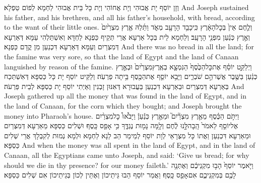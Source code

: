 {וְזָן יוֹסֵף יָת אֲבוּהִי וְיָת אֲחוֹהִי וְיָת כָּל בֵּית אֲבוּהִי לַחְמָא לְפוֹם טַפְלָא׃}
{And Joseph sustained his father, and his brethren, and all his father’s household, with bread, according to the want of their little ones.}{}
{וְלֶ֤חֶם אֵין֙ בְּכׇל\maqqaf הָאָ֔רֶץ כִּֽי\maqqaf כָבֵ֥ד הָרָעָ֖ב מְאֹ֑ד וַתֵּ֜לַהּ אֶ֤רֶץ מִצְרַ֙יִם֙ וְאֶ֣רֶץ כְּנַ֔עַן מִפְּנֵ֖י הָרָעָֽב׃}
{וְלַחְמָא לֵית בְּכָל אַרְעָא אֲרֵי תְּקֵיף כַּפְנָא לַחְדָּא וְאִשְׁתַּלְהִי עַמָּא דְּאַרְעָא דְּמִצְרַיִם וְעַמָּא דְּאַרְעָא דִּכְנַעַן מִן קֳדָם כַּפְנָא׃}
{And there was no bread in all the land; for the famine was very sore, so that the land of Egypt and the land of Canaan languished by reason of the famine.}{}
{וַיְלַקֵּ֣ט יוֹסֵ֗ף אֶת\maqqaf כׇּל\maqqaf הַכֶּ֙סֶף֙ הַנִּמְצָ֤א בְאֶֽרֶץ\maqqaf מִצְרַ֙יִם֙ וּבְאֶ֣רֶץ כְּנַ֔עַן בַּשֶּׁ֖בֶר אֲשֶׁר\maqqaf הֵ֣ם שֹׁבְרִ֑ים וַיָּבֵ֥א יוֹסֵ֛ף אֶת\maqqaf הַכֶּ֖סֶף בֵּ֥יתָה פַרְעֹֽה׃}
{וְלַקֵּיט יוֹסֵף יָת כָּל כַּסְפָּא דְּאִשְׁתְּכַח בְּאַרְעָא דְּמִצְרַיִם וּבְאַרְעָא דִּכְנַעַן בַּעֲבוּרָא דְּאִנּוּן זָבְנִין וְאַיְתִי יוֹסֵף יָת כַּסְפָּא לְבֵית פַּרְעֹה׃}
{And Joseph gathered up all the money that was found in the land of Egypt, and in the land of Canaan, for the corn which they bought; and Joseph brought the money into Pharaoh’s house.}{}
{וַיִּתֹּ֣ם הַכֶּ֗סֶף מֵאֶ֣רֶץ מִצְרַ֘יִם֮ וּמֵאֶ֣רֶץ כְּנַ֒עַן֒ וַיָּבֹ֩אוּ֩ כׇל\maqqaf מִצְרַ֨יִם אֶל\maqqaf יוֹסֵ֤ף לֵאמֹר֙ הָֽבָה\maqqaf לָּ֣נוּ לֶ֔חֶם וְלָ֥מָּה נָמ֖וּת נֶגְדֶּ֑ךָ כִּ֥י אָפֵ֖ס כָּֽסֶף׃}
{וּשְׁלִים כַּסְפָּא מֵאַרְעָא דְּמִצְרַיִם וּמֵאַרְעָא דִּכְנַעַן וַאֲתוֹ כָּל מִצְרָאֵי לְוָת יוֹסֵף לְמֵימַר הַב לַנָא לַחְמָא וּלְמָא נְמוּת לְקִבְלָךְ אֲרֵי שְׁלִים כַּסְפָּא׃}
{And when the money was all spent in the land of Egypt, and in the land of Canaan, all the Egyptians came unto Joseph, and said: ‘Give us bread; for why should we die in thy presence? for our money faileth.’}{}
{וַיֹּ֤אמֶר יוֹסֵף֙ הָב֣וּ מִקְנֵיכֶ֔ם וְאֶתְּנָ֥ה לָכֶ֖ם בְּמִקְנֵיכֶ֑ם אִם\maqqaf אָפֵ֖ס כָּֽסֶף׃}
{וַאֲמַר יוֹסֵף הַבוּ גֵּיתֵיכוֹן וְאֶתֵּין לְכוֹן בְּגֵיתֵיכוֹן אִם שְׁלִים כַּסְפָּא׃}
